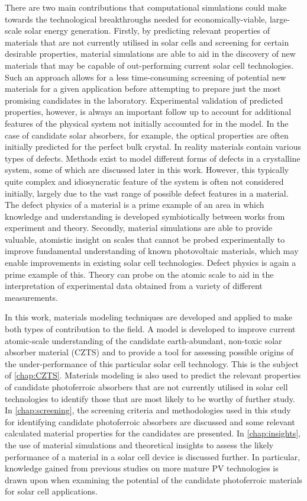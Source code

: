 \documentclass[11pt, twoside]{report}
\begin{document}
There are two main contributions that computational simulations could make towards the technological breakthroughs needed for economically-viable, large-scale solar energy generation. Firstly, by predicting relevant properties of materials that are not currently utilised in solar cells and screening for certain desirable properties, material simulations are able to aid in the discovery of new materials that may be capable of out-performing current solar cell technologies. Such an approach allows for a less time-consuming screening of potential new materials for a given application before attempting to prepare just the most promising candidates in the laboratory. Experimental validation of predicted properties, however, is always an important follow up to account for additional features of the physical system not initially accounted for in the model. In the case of candidate solar absorbers, for example, the optical properties are often initially predicted for the perfect bulk crystal. In reality materials contain various types of defects. Methods exist to model different forms of defects in a crystalline system, some of which are discussed later in this work. However, this typically quite complex and idiosyncratic feature of the system is often not considered initially, largely due to the vast range of possible defect features in a material. The defect physics of a material is a prime example of an area in which knowledge and understanding is developed symbiotically between works from experiment and theory. Secondly, material simulations are able to provide valuable, atomistic insight on scales that cannot be probed experimentally to improve fundamental understanding of known photovoltaic materials, which may enable improvements in existing solar cell technologies. Defect physics is again a prime example of this. Theory can probe on the atomic scale to aid in the interpretation of experimental data obtained from a variety of different measurements.

In this work, materials modeling techniques are developed and applied to make both types of contribution to the field. A model is developed to improve current atomic-scale understanding of the candidate earth-abundant, non-toxic solar absorber material {\CZTS} (CZTS) and to provide a tool for assessing possible origins of the under-performance of this particular solar cell technology. This is the subject of \autoref{chap:CZTS}. Materials modeling is also used to predict the relevant properties of candidate photoferroic absorbers that are not currently utilised in solar cell technologies to identify those that are most likely to be worthy of further study. In \autoref{chap:screening}, the screening criteria and methodologies used in this study for identifying candidate photoferroic absorbers are discussed and some relevant calculated material properties for the candidates are presented. In \autoref{chap:insights}, the use of material simulations and theoretical insights to assess the likely performance of a material in a solar cell device is discussed further. In particular, knowledge gained from previous studies on more mature PV technologies is drawn upon when examining the potential of the candidate photoferroic materials for solar cell applications.
\end{document}
